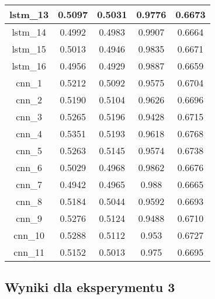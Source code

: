 \begin{table}[]
\begin{tabular}{|c|c|c|c|c|}
        lstm\_13 & 0.5097                       & 0.5031      & 0.9776 & 0.6673 \\ \hline
        lstm\_14 & 0.4992                       & 0.4983      & 0.9907 & 0.6664 \\ \hline
        lstm\_15 & 0.5013                       & 0.4946      & 0.9835 & 0.6671 \\ \hline
        lstm\_16 & 0.4956                       & 0.4929      & 0.9887 & 0.6659 \\ \hline
        cnn\_1   & 0.5212                       & 0.5092      & 0.9575 & 0.6704 \\ \hline
        cnn\_2   & 0.5190                       & 0.5104      & 0.9626 & 0.6696 \\ \hline
        cnn\_3   & 0.5265                       & 0.5196      & 0.9428 & 0.6715 \\ \hline
        cnn\_4   & 0.5351                       & 0.5193      & 0.9618 & 0.6768 \\ \hline
        cnn\_5   & 0.5263                       & 0.5145      & 0.9574 & 0.6738 \\ \hline
        cnn\_6   & 0.5029                       & 0.4968      & 0.9862 & 0.6676 \\ \hline
        cnn\_7   & 0.4942                       & 0.4965      & 0.988  & 0.6665 \\ \hline
        cnn\_8   & 0.5184                       & 0.5044      & 0.9592 & 0.6693 \\ \hline
        cnn\_9   & 0.5276                       & 0.5124      & 0.9488 & 0.6710 \\ \hline
        cnn\_10  & 0.5288                       & 0.5112      & 0.953  & 0.6727 \\ \hline
        cnn\_11  & 0.5152                       & 0.5013      & 0.975  & 0.6695 \\ \hline
    \end{tabular}
\end{table}

\newpage %
\subsection{\label{wyniki_eksperymentow_eks_3}Wyniki dla eksperymentu 3}


